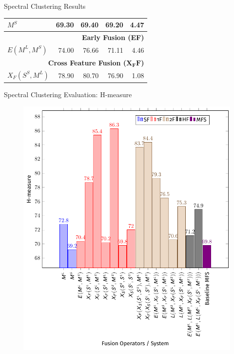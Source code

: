 \documentclass[10pt,=table]{beamer}
\newcommand\mlex{M^{\scriptscriptstyle L}}
\newcommand\msyn{M^{\scriptscriptstyle S}}
\newcommand\ssyn{S^{\scriptscriptstyle S}}
\begin{document}
\begin{frame}{Spectral Clustering Results}
\begin{overprint}
\begin{minipage}[c][.8\textheight][c]{\linewidth}
\begin{tabular}{@{}lrrrr@{}}
		 	$\msyn$                    &	69.30	& 69.40 & 69.20 & 4.47\\
		    \midrule 
		    \multicolumn{5}{r}{\textbf{Early Fusion (EF)}} \\ %
   			\rowcolor{orangeEric!70} 
		    $E(\mlex, \msyn)$		&	{74.00}	& 76.66 & {71.11} & 4.46\\
			\midrule \midrule
	       \multicolumn{5}{r}{\textbf{Cross Feature Fusion ($\mathbf{X_FF}$)}}       \\
 		   \rowcolor{greenEric!70} 
       	   $X_F(\ssyn, \mlex)$		&	{78.90}	& 80.70 & {76.90}	 & 1.08 \\	   	         
       	   \bottomrule
			\end{tabular}		
		\end{minipage}
	\end{overprint}
\end{frame}

\begin{frame}{Spectral Clustering Evaluation: H-measure}
\begin{figure}
	\centering 
	\includegraphics[width=.6\linewidth]{image2/Chapitre4/spectral_hmeasure_bars.pdf}
\end{figure}
\end{frame}
\end{document}
